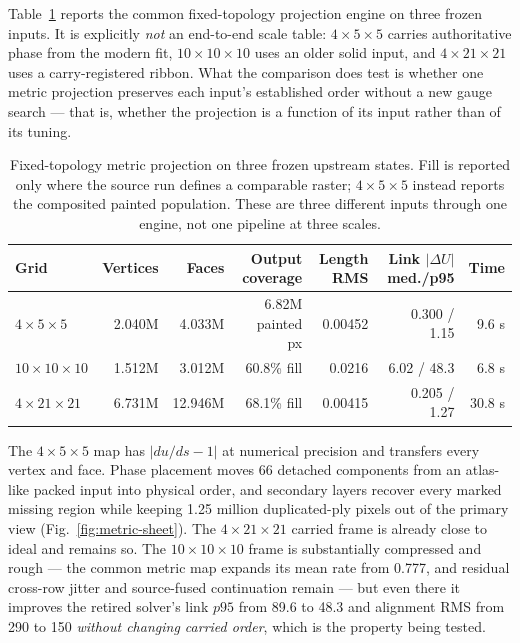 Table~\ref{tab:metric-rungs} reports the common fixed-topology projection engine on three frozen inputs. It is explicitly \emph{not} an end-to-end scale table: $4\times5\times5$ carries authoritative phase from the modern fit, $10\times10\times10$ uses an older solid input, and $4\times21\times21$ uses a carry-registered ribbon. What the comparison does test is whether one metric projection preserves each input's established order without a new gauge search --- that is, whether the projection is a function of its input rather than of its tuning.

\begin{table}[t]
  \caption{Fixed-topology metric projection on three frozen upstream states. Fill is reported only where the source run defines a comparable raster; $4\times5\times5$ instead reports the composited painted population. These are three different inputs through one engine, not one pipeline at three scales.}
  \label{tab:metric-rungs}
  \centering
  \small
  \begin{tabular}{@{}lrrrrrr@{}}
    \toprule
    Grid & Vertices & Faces & Output coverage & Length RMS & Link $|\Delta U|$ med./p95 & Time \\
    \midrule
    $4\times5\times5$ & 2.040M & 4.033M & 6.82M painted px & 0.00452 & 0.300 / 1.15 & 9.6 s \\
    $10\times10\times10$ & 1.512M & 3.012M & 60.8\% fill & 0.0216 & 6.02 / 48.3 & 6.8 s \\
    $4\times21\times21$ & 6.731M & 12.946M & 68.1\% fill & 0.00415 & 0.205 / 1.27 & 30.8 s \\
    \bottomrule
  \end{tabular}
\end{table}

The $4\times5\times5$ map has $|du/ds-1|$ at numerical precision and transfers every vertex and face. Phase placement moves 66 detached components from an atlas-like packed input into physical order, and secondary layers recover every marked missing region while keeping 1.25 million duplicated-ply pixels out of the primary view (Fig.~\ref{fig:metric-sheet}). The $4\times21\times21$ carried frame is already close to ideal and remains so. The $10\times10\times10$ frame is substantially compressed and rough --- the common metric map expands its mean rate from 0.777, and residual cross-row jitter and source-fused continuation remain --- but even there it improves the retired solver's link $p95$ from 89.6 to 48.3 and alignment RMS from 290 to 150 \emph{without changing carried order}, which is the property being tested.

